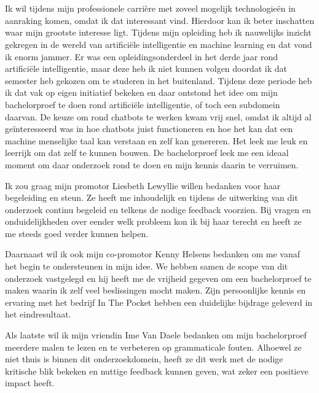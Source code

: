 
\chapter*{}
\label{ch:voorwoord}


Ik wil tijdens mijn professionele carrière met zoveel mogelijk technologieën in aanraking komen, omdat ik dat interessant vind. Hierdoor kan ik beter inschatten waar mijn grootste interesse ligt. Tijdens mijn opleiding heb ik nauwelijks inzicht gekregen in de wereld van artificiële intelligentie en machine learning en dat vond ik enorm jammer. Er was een opleidingsonderdeel in het derde jaar rond artificiële intelligentie, maar deze heb ik niet kunnen volgen doordat ik dat semester heb gekozen om te studeren in het buitenland. Tijdens deze periode heb ik dat vak op eigen initiatief bekeken en daar ontstond het idee om mijn bachelorproef te doen rond artificiële intelligentie, of toch een subdomein daarvan. De keuze om rond chatbots te werken kwam vrij snel, omdat ik altijd al geïnteresseerd was in hoe chatbots juist functioneren en hoe het kan dat een machine menselijke taal kan verstaan en zelf kan genereren. Het leek me leuk en leerrijk om dat zelf te kunnen bouwen. De bachelorproef leek me een ideaal moment om daar onderzoek rond te doen en mijn kennis daarin te verruimen.

Ik zou graag mijn promotor Liesbeth Lewyllie willen bedanken voor haar begeleiding en steun. Ze heeft me inhoudelijk en tijdens de uitwerking van dit onderzoek continu begeleid en telkens de nodige feedback voorzien. Bij vragen en onduidelijkheden over eender welk probleem kon ik bij haar terecht en heeft ze me steeds goed verder kunnen helpen.

Daarnaast wil ik ook mijn co-promotor Kenny Helsens bedanken om me vanaf het begin te ondersteunen in mijn idee. We hebben samen de scope van dit onderzoek vastgelegd en hij heeft me de vrijheid gegeven om een bachelorproef te maken waarin ik zelf veel beslissingen mocht maken. Zijn persoonlijke kennis en ervaring met het bedrijf In The Pocket hebben een duidelijke bijdrage geleverd in het eindresultaat.

Als laatste wil ik mijn vriendin Ime Van Daele bedanken om mijn bachelorproef meerdere malen te lezen en te verbeteren op grammaticale fouten. Alhoewel ze niet thuis is binnen dit onderzoekdomein, heeft ze dit werk met de nodige kritische blik bekeken en nuttige feedback kunnen geven, wat zeker een positieve impact heeft.
